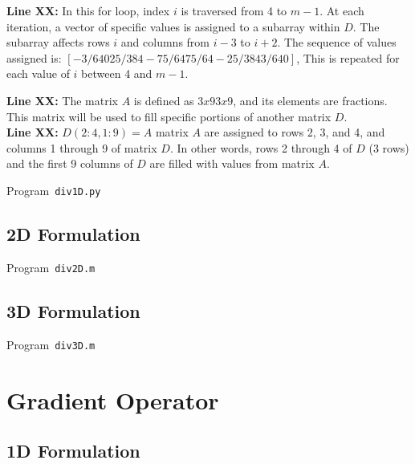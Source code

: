\textbf{Line XX:} In this for loop, index $i$ is traversed from 4 to $m-1$. At each iteration, a vector of specific values ​​is assigned to a subarray within $D$. The subarray affects rows $i$ and columns from $i-3$ to $i+2$. The sequence of values ​​assigned is: $[-3/640 25/384 -75/64 75/64 -25/384 3/640]$, This is repeated for each value of $i$ between 4 and $m-1$.

\textbf{Line XX:} The matrix $A$ is defined as $3x93x9$, and its elements are fractions. This matrix will be used to fill specific portions of another matrix $D$.\\

\textbf{Line XX:} $D(2:4, 1:9) = A$ matrix $A$ are assigned to rows 2, 3, and 4, and columns 1 through 9 of matrix $D$. In other words, rows 2 through 4 of $D$ (3 rows) and the first 9 columns of $D$ are filled with values ​​from matrix $A$.


\begin{listing}[ht!]
	\tiny
	\centering
	\caption{Program~\texttt{div1D.py}}
	\label{code:div1D.py}
\end{listing}

\subsection{2D Formulation}

\begin{listing}[ht!]
	\tiny
	\centering
	\caption{Program~\texttt{div2D.m}}
	\label{code:div2D.m}
\end{listing}

\subsection{3D Formulation}

\begin{listing}[ht!]
	\tiny
	\centering
	\caption{Program~\texttt{div3D.m}}
	\label{code:div3D.m}
\end{listing}

\section{Gradient Operator}

\subsection{1D Formulation}

